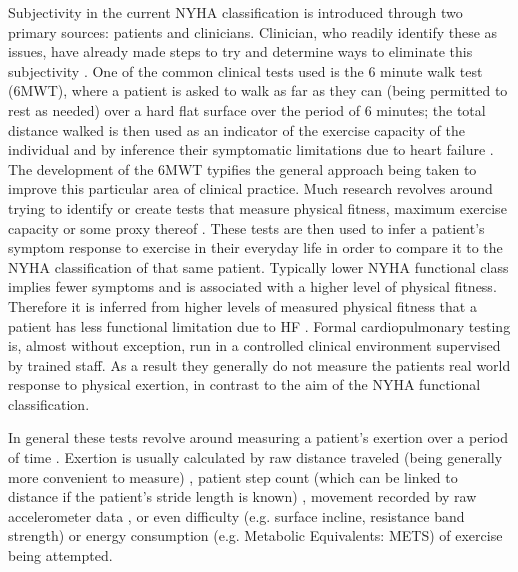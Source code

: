 \documentclass[]{article}
\begin{document}
Subjectivity in the current NYHA classification is introduced through two primary sources: patients and clinicians. Clinician, who readily identify these as issues, have already made steps to try and determine ways to eliminate this subjectivity \cite{Bennett2002}. One of the common clinical tests used is the 6 minute walk test (6MWT), where a patient is asked to walk as far as they can (being permitted to rest as needed) over a hard flat surface over the period of 6 minutes; the total distance walked is then used as an indicator of the exercise capacity of the individual and by inference their symptomatic limitations due to heart failure \cite{Roul1998}. The development of the 6MWT typifies the general approach being taken to improve this particular area of clinical practice. Much research revolves around trying to identify or create tests that measure physical fitness, maximum exercise capacity or some proxy thereof \cite{Balady,Uth2004,Kline1987,Cooper1969,Saalasti2012,Butte2012,Ap5072017,Zhao2017}. These tests are then used to infer a patient's symptom response to exercise in their everyday life in order to compare it to the NYHA classification of that same patient. Typically lower NYHA functional class implies fewer symptoms and is associated with a higher level of physical fitness. Therefore it is inferred from higher levels of measured physical fitness that a patient has less functional limitation due to HF \cite{Balady,Saalasti2012,Zhao2017}. Formal cardiopulmonary testing is, almost without exception, run in a controlled clinical environment supervised by trained staff. As a result they generally do not measure the patients real world response to physical exertion, in contrast to the aim of the NYHA functional classification.

In general these tests revolve around measuring a patient's exertion over a period of time \cite{Balady,Cooper1969,Kline1987,Saalasti2012,Ap5072017,Zhao2017,Roul1998}. Exertion is usually calculated by raw distance traveled (being generally more convenient to measure) \cite{Saalasti2012,Kline1987,Balady,Roul1998}, patient step count (which can be linked to distance if the patient's stride length is known) \cite{Abdulmajeed2016,Eapen2016a,Wen2017,El-Amrawy2015,Ap5072017,An2017,Bromberg2015,Abeles2017}, movement recorded by raw accelerometer data \cite{Zhao2017,Bornstein2011,Awais2015,Jehn2013}, or even difficulty (e.g. surface incline, resistance band strength) \cite{Abdulmajeed2016,Bromberg2015} or energy consumption (e.g. Metabolic Equivalents: METS) \cite{HeartFoundation2014,Balady,Butte2012} of exercise being attempted.
\end{document}
